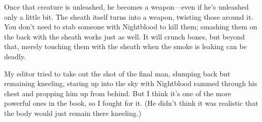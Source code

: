 Once that creature is unleashed, he becomes a weapon—even if he’s unleashed only a little bit. The sheath itself turns into a weapon, twisting those around it. You don’t need to stab someone with Nightblood to kill them; smashing them on the back with the sheath works just as well. It will crunch bones, but beyond that, merely touching them with the sheath when the smoke is leaking can be deadly.

My editor tried to take out the shot of the final man, slumping back but remaining kneeling, staring up into the sky with Nightblood rammed through his chest and propping him up from behind. But I think it’s one of the more powerful ones in the book, so I fought for it. (He didn’t think it was realistic that the body would just remain there kneeling.)



